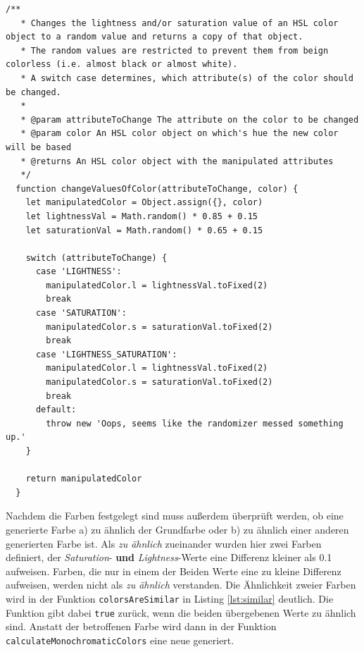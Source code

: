 \begin{lstlisting}[caption=Setzen der HSL-Werte, label=lst:hsl]
  /**
   * Changes the lightness and/or saturation value of an HSL color object to a random value and returns a copy of that object.
   * The random values are restricted to prevent them from beign colorless (i.e. almost black or almost white).
   * A switch case determines, which attribute(s) of the color should be changed.
   *
   * @param attributeToChange The attribute on the color to be changed
   * @param color An HSL color object on which's hue the new color will be based
   * @returns An HSL color object with the manipulated attributes
   */
  function changeValuesOfColor(attributeToChange, color) {
    let manipulatedColor = Object.assign({}, color)
    let lightnessVal = Math.random() * 0.85 + 0.15
    let saturationVal = Math.random() * 0.65 + 0.15

    switch (attributeToChange) {
      case 'LIGHTNESS':
        manipulatedColor.l = lightnessVal.toFixed(2)
        break
      case 'SATURATION':
        manipulatedColor.s = saturationVal.toFixed(2)
        break
      case 'LIGHTNESS_SATURATION':
        manipulatedColor.l = lightnessVal.toFixed(2)
        manipulatedColor.s = saturationVal.toFixed(2)
        break
      default:
        throw new 'Oops, seems like the randomizer messed something up.'
    }

    return manipulatedColor
  }
\end{lstlisting}

Nachdem die Farben festgelegt sind muss außerdem überprüft werden, ob  eine generierte Farbe a) zu ähnlich der Grundfarbe oder b) zu ähnlich einer anderen generierten Farbe ist.
Als \textit{zu ähnlich} zueinander wurden hier zwei Farben definiert, der \textit{Saturation}- \textbf{und} \textit{Lightness}-Werte eine Differenz kleiner als 0.1 aufweisen. Farben, die nur in einem der Beiden Werte eine zu kleine Differenz aufweisen, werden nicht als \textit{zu ähnlich} verstanden.
Die Ähnlichkeit zweier Farben wird in  der Funktion \verb|colorsAreSimilar| in Listing \ref{lst:similar} deutlich. Die Funktion gibt dabei \verb|true| zurück, wenn die beiden übergebenen Werte zu ähnlich sind. Anstatt der betroffenen Farbe wird dann in der Funktion \verb|calculateMonochromaticColors| eine neue generiert.

